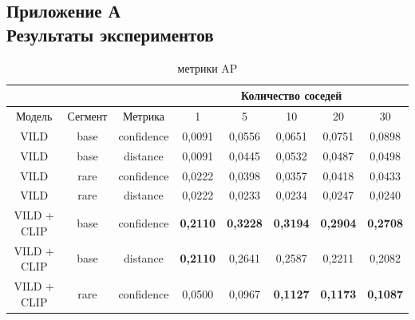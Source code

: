 \documentclass[a4paper,14pt]{article}
\begin{document}
    \begin{landscape}

        \begin{flushright}
            \section*{\normalsize \hfill Приложение А \\ \hfill Результаты экспериментов}
        \end{flushright}

        \begin{table}[H]
            \centering
            \caption{метрики AP}
            \label{tab:experiments_main}
            \begin{tabular}{ccc|ccccc|}
                \cline{4-8}
                & & & \multicolumn{5}{c|}{Количество соседей} \\ \hline
                Модель              & Сегмент & Метрика    & 1               & 5               & 10              & 20              & 30              \\
                \midrule
                VILD                & base    & confidence & 0,0091          & 0,0556          & 0,0651          & 0,0751          & 0,0898          \\
                VILD                & base    & distance   & 0,0091          & 0,0445          & 0,0532          & 0,0487          & 0,0498          \\
                VILD                & rare    & confidence & 0,0222          & 0,0398          & 0,0357          & 0,0418          & 0,0433          \\
                VILD                & rare    & distance   & 0,0222          & 0,0233          & 0,0234          & 0,0247          & 0,0240          \\ \hline
                VILD + CLIP         & base    & confidence & \textbf{0,2110} & \textbf{0,3228} & \textbf{0,3194} & \textbf{0,2904} & \textbf{0,2708} \\
                VILD + CLIP         & base    & distance   & \textbf{0,2110} & 0,2641          & 0,2587          & 0,2211          & 0,2082          \\
                VILD + CLIP         & rare    & confidence & 0,0500          & 0,0967          & \textbf{0,1127} & \textbf{0,1173} & \textbf{0,1087} \\

\end{tabular}
\end{table}
\end{landscape}
\end{document}
